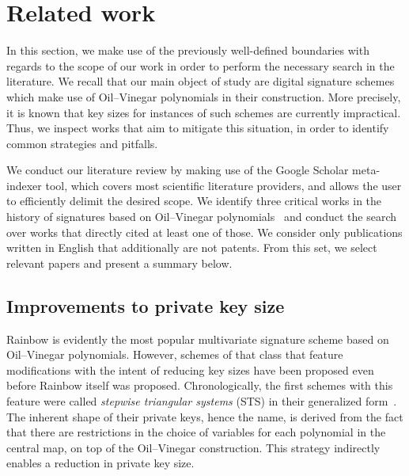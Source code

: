 \documentclass[draft, 12pt, a4paper, oneside]{memoir}
\begin{document}

\section{Related work}\label{sec:related}

In this section, we make use of the previously well-defined boundaries with regards to the scope of our work in order to perform the necessary search in the literature. We recall that our main object of study are digital signature schemes which make use of Oil--Vinegar polynomials in their construction. More precisely, it is known that key sizes for instances of such schemes are currently impractical. Thus, we inspect works that aim to mitigate this situation, in order to identify common strategies and pitfalls.

We conduct our literature review by making use of the Google Scholar meta-indexer tool, which covers most scientific literature providers, and allows the user to efficiently delimit the desired scope. We identify three critical works in the history of signatures based on Oil--Vinegar polynomials~\cite{Patarin:199709,Kipnis:199904,Ding:200506} and conduct the search over works that directly cited at least one of those. We consider only publications written in English that additionally are not patents. From this set, we select relevant papers and present a summary below.





\subsection{Improvements to private key size}

Rainbow is evidently the most popular multivariate signature scheme based on Oil--Vinegar polynomials. However, schemes of that class that feature modifications with the intent of reducing key sizes have been proposed even before Rainbow itself was proposed. Chronologically, the first schemes with this feature were called \emph{stepwise triangular systems} (STS) in their generalized form~\cite{Wolf:200603}. The inherent shape of their private keys, hence the name, is derived from the fact that there are restrictions in the choice of variables for each polynomial in the central map, on top of the Oil--Vinegar construction. This strategy indirectly enables a reduction in private key size. 
\end{document}
